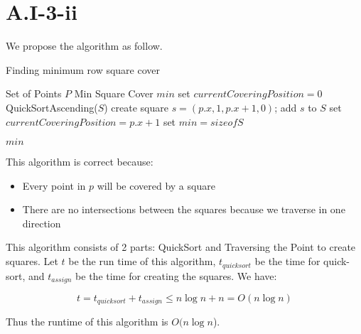 \section{A.I-3-ii}
\label{a-1-3-2}
We propose the algorithm as follow.

\begin{algorithm}
  \caption{Finding minimum row square cover}
  \label{alg:row_minimum}
  \begin{algorithmic}
    \Require Set of Points $P$
    \Ensure Min Square Cover $min$
    \renewcommand{\algorithmicrequire}{\textbf{Input:}}
    \renewcommand{\algorithmicensure}{\textbf{Output:}}
    \algnewcommand{}
    \algnewcommand\Operation{\item[\algorithmicoperation]}
    \Operation
    \State set $currentCoveringPosition = 0$
    \State QuickSortAscending($S$)
    \State create square $s = (p.x, 1, p.x + 1, 0)$;
    \State add $s$ to $S$
    \State set $currentCoveringPosition = p.x + 1$
    \EndIf
    \State set $min = size of S$

    \Return $min$
    \EndFor
  \end{algorithmic}
\end{algorithm}

This algorithm is correct because:

\begin{itemize}
    \item Every point in $p$ will be covered by a square
    \item There are no intersections between the squares because we traverse in one direction
  \end{itemize}

  This algorithm consists of 2 parts: QuickSort and Traversing the Point to create squares. Let $t$ be the run time of this algorithm, $t_{quicksort}$ be the time for quick-sort, and $t_{assign}$ be the time for creating the squares. We have:

  \begin{equation}
    t = t_{quicksort} + t_{assign} \leq n\log n + n = O(n\log n)
  \end{equation}

  Thus the runtime of this algorithm is $O(n\log n$).
